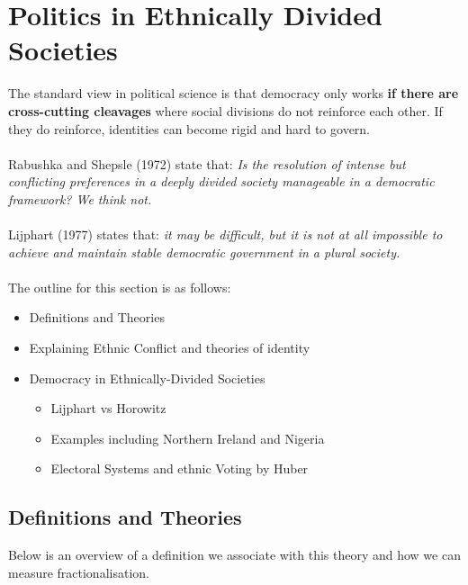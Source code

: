 \documentclass[12pt, letterpaper]{article}
\begin{document}
\newpage
\section{Politics in Ethnically Divided Societies}
The standard view in political science is that democracy only works \textbf{if there are cross-cutting cleavages} where social divisions do not reinforce each other. If they do reinforce, identities can become rigid and hard to govern.\\\\
Rabushka and Shepsle (1972) state that: \textit{Is the resolution of intense but conflicting preferences in a deeply divided society manageable in a democratic framework? We think not.}\\\\
Lijphart (1977) states that: \textit{it may be difficult, but it is not at all impossible to achieve and maintain stable democratic government in a plural society.}\\\\
The outline for this section is as follows:
\begin{itemize}
	\item Definitions and Theories
	\item Explaining Ethnic Conflict and theories of identity
	\item Democracy in Ethnically-Divided Societies
		\begin{itemize}
			\item Lijphart vs Horowitz
			\item Examples including Northern Ireland and Nigeria
			\item Electoral Systems and ethnic Voting by Huber
		\end{itemize}
\end{itemize}

\subsection{Definitions and Theories}
Below is an overview of a definition we associate with this theory and how we can measure fractionalisation.
\end{document}
